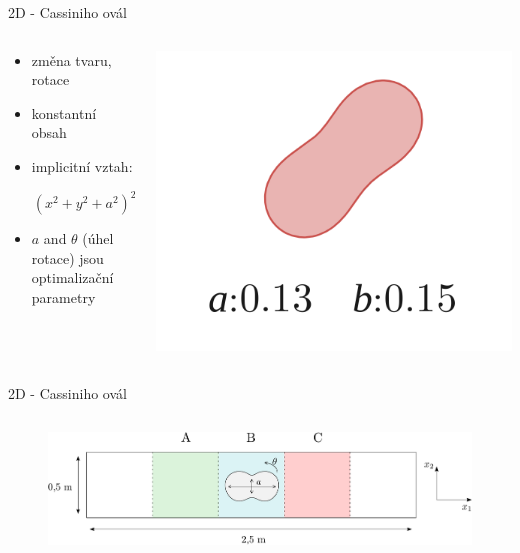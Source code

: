 \documentclass[aspectratio=169,xcolor=dvipsnames]{beamer}
\begin{document}
\begin{frame}{2D - Cassiniho ovál}
	\addtocounter{framenumber}{-1}
	\begin{columns}
		\begin{column}{.6\textwidth}
			\begin{itemize}
				\setlength\itemsep{1.4em}
				\item změna tvaru, rotace
				\item konstantní obsah
				\item implicitní vztah:
			\end{itemize}		
			\vspace{4mm}
			$$ \ \ \ \ \ \ \ \ \left( x^{2}+ y^{2}+a^{2} \right)^{2}-4 x ^{2} a^{2}-b^{4} = 0 $$
			\vspace{-3mm}
			\begin{itemize}
				\item $ a $ and $ \theta $ (úhel rotace) jsou optimalizační parametry
			\end{itemize}	
		\end{column}
		\begin{column}{.4\textwidth}
			\includegraphics[width=0.9\linewidth, trim={0 0 0 0}, clip]{Images/a3.png}			
		\end{column}
	\end{columns}	
\end{frame}
\begin{frame}{2D - Cassiniho ovál}
	\addtocounter{framenumber}{-1}
	\begin{columns}
		\begin{column}{1\textwidth}
			\begin{figure}
				\includegraphics[width=1\linewidth, trim={0 0 0 0}, clip]{Images/cassini.pdf}		
			\end{figure}
		\end{column}
	\end{columns}	
\end{frame}
\end{document}
